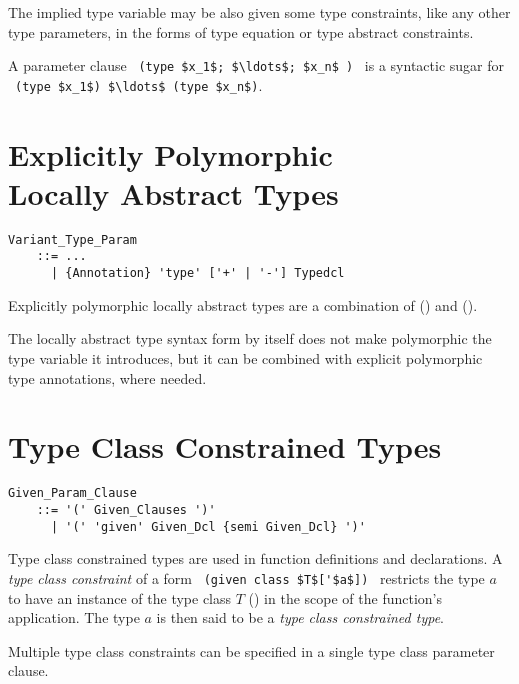 The implied type variable may be also given some type constraints, like any other type parameters, in the forms of type equation or type abstract constraints. 

A parameter clause ~\lstinline!(type $x_1$; $\ldots$; $x_n$ )!~ is a syntactic sugar for ~\lstinline!(type $x_1$) $\ldots$ (type $x_n$)!. 





\section[Explicitly Polymorphic Locally Abstract Types]{Explicitly Polymorphic \\ Locally Abstract Types}
\label{sec:locally-abstract-polymorphic-types}

\grammar\begin{lstlisting}
Variant_Type_Param 
    ::= ...
      | {Annotation} 'type' ['+' | '-'] Typedcl
\end{lstlisting}

Explicitly polymorphic locally abstract types are a combination of () and ().

The locally abstract type syntax form by itself does not make polymorphic the type variable it introduces, but it can be combined with explicit polymorphic type annotations, where needed. 





\section{Type Class Constrained Types}
\label{sec:type-class-constrained-types}

\grammar\begin{lstlisting}
Given_Param_Clause 
    ::= '(' Given_Clauses ')'
      | '(' 'given' Given_Dcl {semi Given_Dcl} ')'
\end{lstlisting}

Type class constrained types are used in function definitions and declarations. A {\em type class constraint} of a form ~\lstinline!(given class $T$['$a$])!~ restricts the type $a$ to have an instance of the type class $T$ () in the scope of the function's application. The type $a$ is then said to be a {\em type class constrained type}. 

Multiple type class constraints can be specified in a single type class parameter clause. 

